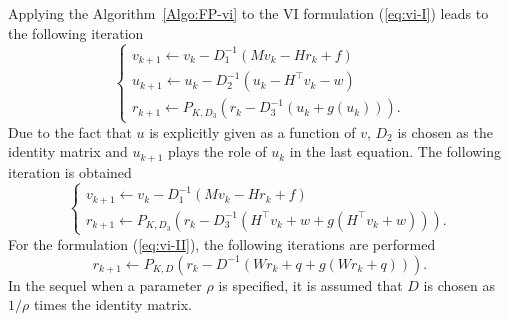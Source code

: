 Applying the Algorithm~\ref{Algo:FP-vi} to the VI formulation (\ref{eq:vi-I}) leads to the following iteration
\begin{equation}
  \label{eq:FP-vi-I}
  \begin{cases}
    v_{k+1} \leftarrow  v_k - D_1^{-1}( M v_{k} - H r_k +f) \\
    u_{k+1} \leftarrow  u_k - D_2^{-1}( u_k - H^\top v_{k} - w) \\ 
    r_{k+1} \leftarrow  P_{K,D_3}(r_k - D_3^{-1}(u_k +  g(u_k))).
  \end{cases}
\end{equation}
Due to the fact that $u$ is explicitly given as a function of $v$, $D_2$ is chosen as the identity matrix and $u_{k+1}$ plays the role of $u_k$ in the last equation. The following iteration is obtained
\begin{equation}
  \label{eq:FP-vi-Ibis}
  \begin{cases}
    v_{k+1} \leftarrow  v_k - D_1^{-1}( M v_{k} - H r_k +f) \\
    r_{k+1} \leftarrow  P_{K,D_3}(r_k - D_3^{-1}(H^\top v_k + w +  g(H^\top v_k+ w ))).
  \end{cases}
\end{equation}
For the formulation (\ref{eq:vi-II}), the following iterations are performed
\begin{equation}
  \label{eq:FP-vi-II}
       r_{k+1} \leftarrow  P_{K,D}(r_k - D^{-1}( W r_k + q +  g(W r_k + q ))).
\end{equation}
 In the sequel when a parameter $\rho$ is specified, it is assumed that $D$ is chosen as $1/\rho$ times the identity matrix.


